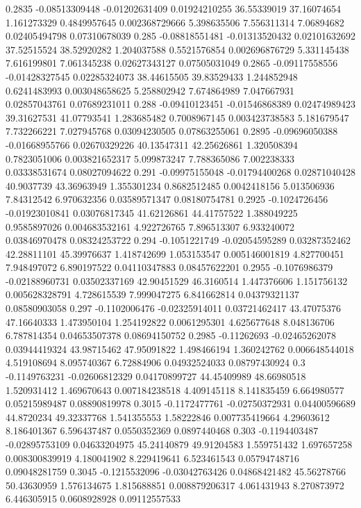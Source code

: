 {0.2835 -0.08513309448 -0.01202631409 0.01924210255 36.55339019 37.16074654 1.161273329 0.4849957645 0.002368729666 5.398635506 7.556311314 7.06894682 0.02405494798 0.07310678039
0.285 -0.08818551481 -0.01313520432 0.02101632692 37.52515524 38.52920282 1.204037588 0.5521576854 0.002696876729 5.331145438 7.616199801 7.061345238 0.02627343127 0.07505031049
0.2865 -0.09117558556 -0.01428327545 0.02285324073 38.44615505 39.83529433 1.244852948 0.6241483993 0.003048658625 5.258802942 7.674864989 7.047667931 0.02857043761 0.07689231011
0.288 -0.09410123451 -0.01546868389 0.02474989423 39.31627531 41.07793541 1.283685482 0.7008967145 0.003423738583 5.181679547 7.732266221 7.027945768 0.03094230505 0.07863255061
0.2895 -0.09696050388 -0.01668955766 0.02670329226 40.13547311 42.25626861 1.320508394 0.7823051006 0.003821652317 5.099873247 7.788365086 7.002238333 0.03338531674 0.08027094622
0.291 -0.09975155048 -0.01794400268 0.02871040428 40.9037739 43.36963949 1.355301234 0.8682512485 0.0042418156 5.013506936 7.84312542 6.970632356 0.03589571347 0.08180754781
0.2925 -0.1024726456 -0.01923010841 0.03076817345 41.62126861 44.41757522 1.388049225 0.9585897026 0.004683532161 4.922726765 7.896513307 6.933240072 0.03846970478 0.08324253722
0.294 -0.1051221749 -0.02054595289 0.03287352462 42.28811101 45.39976637 1.418742699 1.053153547 0.005146001819 4.827700451 7.948497072 6.890197522 0.04110347883 0.08457622201
0.2955 -0.1076986379 -0.02188960731 0.03502337169 42.90451529 46.3160514 1.447376606 1.151756132 0.005628328791 4.728615539 7.999047275 6.841662814 0.04379321137 0.08580903058
0.297 -0.1102006476 -0.02325914011 0.03721462417 43.47075376 47.16640333 1.473950104 1.254192822 0.0061295301 4.625677648 8.048136706 6.787814354 0.04653507378 0.08694150752
0.2985 -0.11262693 -0.02465262078 0.03944419324 43.98715462 47.95091822 1.498466194 1.360242762 0.006648544018 4.519108694 8.095740367 6.72884906 0.04932524033 0.08797430924
0.3 -0.1149763231 -0.02606812329 0.04170899727 44.45409989 48.66980518 1.520931412 1.469670643 0.007184238518 4.409145118 8.141835459 6.664980577 0.05215989487 0.08890819978
0.3015 -0.1172477761 -0.02750372931 0.04400596689 44.8720234 49.32337768 1.541355553 1.58222846 0.007735419664 4.29603612 8.186401367 6.596437487 0.0550352369 0.0897440468
0.303 -0.1194403487 -0.02895753109 0.04633204975 45.24140879 49.91204583 1.559751432 1.697657258 0.008300839919 4.180041902 8.229419641 6.523461543 0.05794748716 0.09048281759
0.3045 -0.1215532096 -0.03042763426 0.04868421482 45.56278766 50.43630959 1.576134675 1.815688851 0.008879206317 4.061431943 8.270873972 6.446305915 0.0608928928 0.09112557533
}
